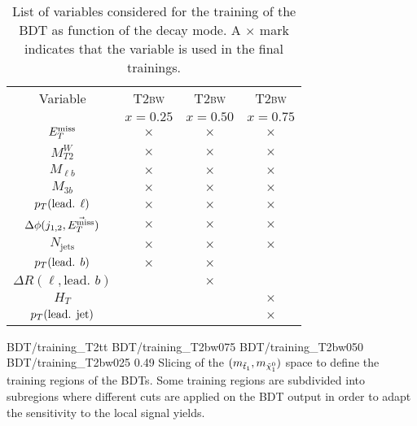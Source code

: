 \begin{table}[h!]
\begin{center}
\begin{tabular}{|c|ccc|}
                \hline
                Variable                            & \textsc{T2bw}  & \textsc{T2bw}  & \textsc{T2bw}      \\
                                                    & $x=0.25$       & $x=0.50$       & $x=0.75$  \\
                \hline
                $E_T^\text{miss}$                              & $\times$       & $\times$       & $\times$  \\
                $M_{T2}^W$                          & $\times$       & $\times$       & $\times$  \\
                $M_{\ell b}$                        & $\times$       & $\times$       & $\times$  \\
                $M_{3 b}$                           & $\times$       & $\times$       & $\times$  \\
                $p_T(\text{lead. } \ell)$           & $\times$       & $\times$       & $\times$  \\
                $\Delta\phi(j_{1,2},\vec{E_T^\text{miss}})$    & $\times$       & $\times$       & $\times$  \\
                $N_\text{jets}$                     & $\times$       & $\times$       & $\times$  \\
                $p_T(\text{lead. } b)$              & $\times$       & $\times$       &           \\
                $\Delta R( \ell, \text{lead. } b)$  &                & $\times$       &           \\
                $H_{T}$                             &                &                & $\times$  \\
                $p_T(\text{lead. jet})$             &                &                & $\times$  \\
                \hline
            \end{tabular}
            \caption{List of variables considered for the training of the BDT as
            function of the decay mode. A $\times$ mark indicates that the
            variable is used in the final trainings.}
            \label{tab:BDTVariableUsage}
        \end{center}
    \end{table}

                      {BDT/training_T2tt}
                      {BDT/training_T2bw075}
                      {BDT/training_T2bw050}
                      {BDT/training_T2bw025}
                      {0.49}
                      {Slicing of the $(m_{\tilde{t}_1},m_{\tilde{\chi}_1^0})$
                      space to define the training regions of the BDTs. Some
                      training regions are subdivided into subregions where
                      different cuts are applied on the BDT output in order to
                      adapt the sensitivity to the local signal yields.}

